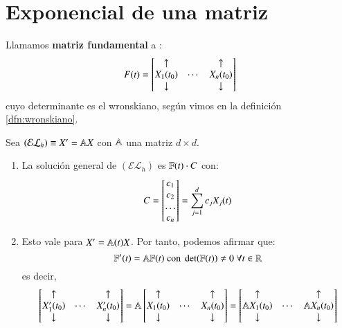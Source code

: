 \section{Exponencial de una matriz}
\begin{dfn}
    Llamamos \textbf{matriz fundamental} a :
   $$
    F(t) = \left[\begin{matrix}\uparrow && \uparrow\\ X_1(t_0) & \cdots & X_n(t_0) \\ \downarrow && \downarrow\end{matrix}\right]
   $$
   cuyo determinante es el wronskiano, según vimos en la definición \ref{dfn:wronskiano}.
\end{dfn}
\begin{obs}
    Sea $(\mathcal{EL}_h) \equiv X' = \mathbb{A} X$ con $\mathbb{A}$ una matriz $d\times d$.\\
    \begin{enumerate}
        \item La solución general de $(\mathcal{EL}_h)$ es $\mathbb{F}(t) \cdot C$ con:
        $$
            C = \left[\begin{matrix}c_1\\c_2\\\ldots\\c_n\end{matrix}\right] = \sum_{j=1}^d c_jX_j(t)
        $$
        \item Esto vale para $X' = \mathbb{A}(t) X$. Por tanto, podemos afirmar que:
        $$
            \mathbb{F}'(t) = \mathbb{A} \mathbb{F}(t) \text{ con } \det(\mathbb{F}(t)) \neq 0\ \forall t\in \mathbb{R}
        $$
        es decir,
        $$
             \left[\begin{matrix}\uparrow && \uparrow\\ X_1'(t_0) & \cdots & X_n'(t_0) \\ \downarrow && \downarrow\end{matrix}\right] = \mathbb{A}  \left[\begin{matrix}\uparrow && \uparrow\\ X_1(t_0) & \cdots & X_n(t_0) \\ \downarrow && \downarrow\end{matrix}\right] =  \left[\begin{matrix}\uparrow && \uparrow\\ \mathbb{A} X_1(t_0) & \cdots & \mathbb{A} X_n(t_0) \\ \downarrow && \downarrow\end{matrix}\right]
        $$
    \end{enumerate}
\end{obs}

